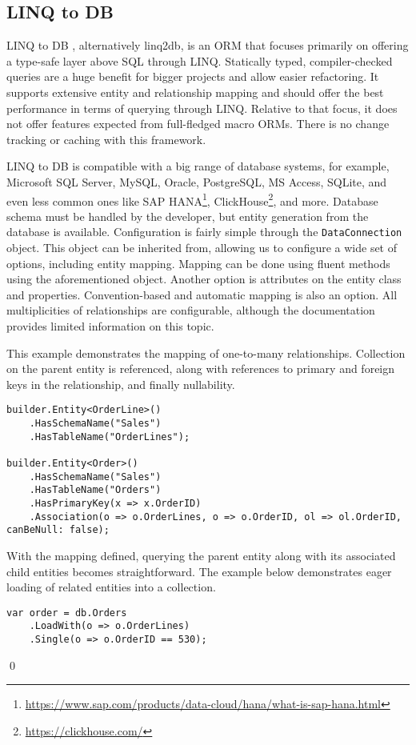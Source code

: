 \subsection{LINQ to DB}

LINQ to DB \cite{linq2db, linq2dbRepo}, alternatively linq2db, is an ORM that focuses primarily on offering a type-safe layer above SQL through LINQ. Statically typed, compiler-checked queries are a huge benefit for bigger projects and allow easier refactoring. It supports extensive entity and relationship mapping and should offer the best performance in terms of querying through LINQ. Relative to that focus, it does not offer features expected from full-fledged macro ORMs. There is no change tracking or caching with this framework.

LINQ to DB is compatible with a big range of database systems, for example, Microsoft SQL Server, MySQL, Oracle, PostgreSQL, MS Access, SQLite, and even less common ones like SAP HANA\footnote{\url{https://www.sap.com/products/data-cloud/hana/what-is-sap-hana.html}}, ClickHouse\footnote{\url{https://clickhouse.com/}}, and more. Database schema must be handled by the developer, but entity generation from the database is available. Configuration is fairly simple through the \texttt{DataConnection} object. This object can be inherited from, allowing us to configure a wide set of options, including entity mapping. Mapping can be done using fluent methods using the aforementioned object. Another option is attributes on the entity class and properties. Convention-based and automatic mapping is also an option. All multiplicities of relationships are configurable, although the documentation provides limited information on this topic. 

\begin{example}
\small
This example demonstrates the mapping of one-to-many relationships. Collection on the parent entity is referenced, along with references to primary and foreign keys in the relationship, and finally nullability.

\begin{lstlisting}[language=CSharp]
builder.Entity<OrderLine>()
    .HasSchemaName("Sales")
    .HasTableName("OrderLines");

builder.Entity<Order>()
    .HasSchemaName("Sales")
    .HasTableName("Orders")
    .HasPrimaryKey(x => x.OrderID)
    .Association(o => o.OrderLines, o => o.OrderID, ol => ol.OrderID, canBeNull: false);
\end{lstlisting}

\small With the mapping defined, querying the parent entity along with its associated child entities becomes straightforward. The example below demonstrates eager loading of related entities into a collection.

\begin{lstlisting}[language=CSharp]
var order = db.Orders
    .LoadWith(o => o.OrderLines)
    .Single(o => o.OrderID == 530);
\end{lstlisting}
\qed
\end{example}

